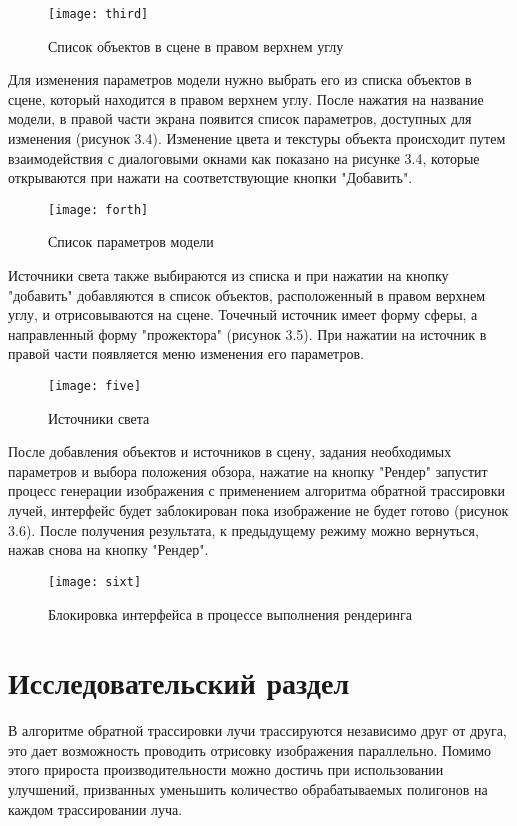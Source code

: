 \documentclass[12pt,a4paper,oneside]{report}
\begin{document}
	\begin{figure}[H]
		\centering
		\texttt{[image: third]}
		\caption{Список объектов в сцене в правом верхнем углу}
	\end{figure}

	Для изменения параметров модели нужно выбрать его из списка объектов в сцене, который находится в правом верхнем углу. После нажатия на название модели, в правой части экрана появится список параметров, доступных для изменения (рисунок 3.4). Изменение цвета и текстуры объекта происходит путем взаимодействия с диалоговыми окнами как показано на рисунке 3.4, которые открываются при нажати на соответствующие кнопки "Добавить".
	
	\begin{figure}[H]
		\centering
		\texttt{[image: forth]}
		\caption{Список параметров модели}
	\end{figure}

	Источники света также выбираются из списка и при нажатии на кнопку "добавить" добавляются в список объектов, расположенный в правом верхнем углу, и отрисовываются на сцене. Точечный источник имеет форму сферы, а направленный форму "прожектора" (рисунок 3.5). При нажатии на источник в правой части появляется меню изменения его параметров. 
	
	\begin{figure}[H]
		\centering
		\texttt{[image: five]}
		\caption{Источники света}
	\end{figure}

	После добавления объектов и источников в сцену, задания необходимых параметров и выбора положения обзора, нажатие на кнопку "Рендер" запустит процесс генерации изображения с применением алгоритма обратной трассировки лучей, интерфейс будет заблокирован пока изображение не будет готово (рисунок 3.6). После получения результата, к предыдущему режиму можно вернуться, нажав снова на кнопку "Рендер".

	\begin{figure}[h]
		\centering
		\texttt{[image: sixt]}
		\caption{Блокировка интерфейса в процессе выполнения рендеринга}
	\end{figure}
	
	
	\chapter{Исследовательский раздел}
	 \quad В алгоритме обратной трассировки лучи трассируются независимо друг от друга, это дает возможность проводить отрисовку изображения параллельно. Помимо этого прироста производительности можно достичь при использовании улучшений, призванных уменьшить количество обрабатываемых полигонов на каждом трассировании луча.
	
\end{document}
